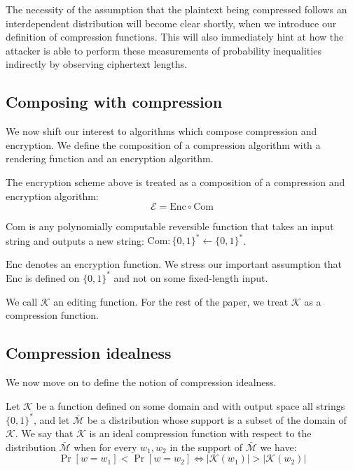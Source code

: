 The necessity of the assumption that the plaintext being compressed follows an
interdependent distribution will become clear shortly, when we introduce our
definition of compression functions. This will also immediately hint at how the
attacker is able to perform these measurements of probability inequalities
indirectly by observing ciphertext lengths.

\subsection{Composing with compression}\label{subsec:comcompose}

We now shift our interest to algorithms which compose compression and
encryption. We define the composition of a compression algorithm with a
rendering function and an encryption algorithm.

The encryption scheme above is treated as a composition of a
compression and encryption algorithm:
\begin{equation*}
    \mathcal{E} = \textrm{Enc} \circ \textrm{Com}
\end{equation*}

$\textrm{Com}$ is any polynomially computable reversible function that takes an
input string and outputs a new string: $\textrm{Com}: \{0, 1\}^* \leftarrow \{0,
1\}^*$.

$\textrm{Enc}$ denotes an encryption function. We stress our important
assumption that $\textrm{Enc}$ is defined on $\{0, 1\}^*$ and not on some
fixed-length input.

We call $\mathcal{K}$ an editing function. For the rest of the paper, we treat
$\mathcal{K}$ as a compression function.

\subsection{Compression idealness}\label{subsec:com_idealness}

We now move on to define the notion of compression idealness.

Let $\mathcal{K}$ be a function defined on some domain and with output space
all strings $\{0, 1\}^*$, and let $\bar{\mathcal{M}}$ be a distribution whose
support is a subset of the domain of $\mathcal{K}$.  We say that $\mathcal{K}$
is an ideal compression function with respect to the distribution
$\bar{\mathcal{M}}$ when for every $w_1, w_2$ in the support of
$\bar{\mathcal{M}}$ we have:
\begin{equation*}
\Pr[w = w_1] < \Pr[w = w_2] \iff \lvert\mathcal{K}(w_1)\rvert > \lvert\mathcal{K}(w_2)\rvert
\end{equation*}

